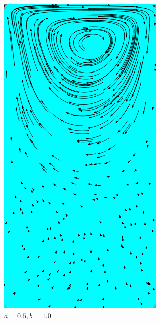 		\begin{figure}[!hptb]
			\centering
			\begin{subfigure}[b]{.5\textwidth}
				\center
				\includegraphics[scale = 0.30]{screenshots/box-05-10.png}
				\caption{$a=0.5, b=1.0$}
			\end{subfigure}%
			\begin{subfigure}[b]{.5\textwidth}
				\center

\end{subfigure}
\end{figure}
